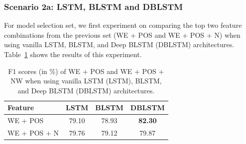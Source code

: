 %

\subsubsection{Scenario 2a: LSTM, BLSTM and DBLSTM}
For model selection set, we first experiment on comparing the top two feature combinations from the previous set (WE + POS and WE + POS + N) when using vanilla LSTM, BLSTM, and Deep BLSTM (DBLSTM) architectures. Table~\ref{tab:modelselection1} shows the results of this experiment.

\begin{table}
	\caption{F1 scores (in \%) of WE + POS and WE + POS + NW when using vanilla LSTM (LSTM), BLSTM, and Deep BLSTM (DBLSTM) architectures.}
	\centering
	\label{tab:modelselection1}
	\begin{tabular}{lccc}
		\hline
		Feature & LSTM & BLSTM & DBLSTM \\
		\hline		\hline
		WE + POS & 79.10 & 78.93 & \textbf{82.30} \\
		WE + POS + N & 79.76 & 79.12 & 79.87 \\
		\hline
	\end{tabular}

\end{table}

